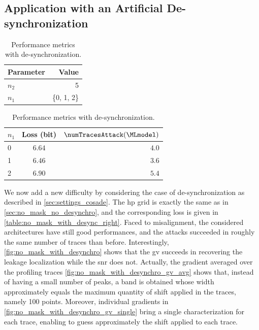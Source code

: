 \subsection{Application with an Artificial De-synchronization}
\label{sec:no_mask_with_desynchro}
\begin{table}
    \centering
    \caption{Settings and results of Exp.~2}
    \label{table:no_mask_with_desync}
    \begin{subtable}{0.49 \textwidth}
        \centering
        \caption{Architecture \glspl{hp}.}
        \begin{tabular}{l r}
            \toprule
            Parameter & Value \\
            \midrule
            \(n_2\) & 5 \\
            \(n_1\) & \{0, 1, 2\} \\
            \bottomrule
        \end{tabular}
        \label{table:no_mask_with_desync_left}
    \end{subtable}
    \begin{subtable}{0.49 \textwidth}
        \centering
        \caption{Performance metrics with de-synchronization.}
        \begin{tabular}{l c r}
            \toprule
            \(n_1\) & Loss (bit) & \(\numTracesAttack(\MLmodel)\) \\
            \midrule
            0 & \(6.64\) & \(4.0\) \\
            1 & \(6.46\) & \(3.6\) \\
            2 & \(6.90\) & \(5.4\) \\
            \bottomrule
        \end{tabular}
        \label{table:no_mask_with_desync_right}
    \end{subtable}
\end{table}

We now add a new difficulty by considering the case of de-synchronization as described in \autoref{sec:settings_cosade}.
The \gls{hp} grid is exactly the same as in \autoref{sec:no_mask_no_desynchro}, and the corresponding loss is given in \autoref{table:no_mask_with_desync_right}. 
Faced to misalignment, the considered architectures have still good performances, and the attacks succeeded in roughly the same number of traces than before. 
Interestingly, \autoref{fig:no_mask_with_desynchro} shows that the \gls{gv} succeeds in recovering the leakage localization while the \gls{snr} does not. 
Actually, the gradient averaged over the profiling traces \autoref{fig:no_mask_with_desynchro_gv_avg} shows that, instead of having a small number of peaks, a band is obtained whose width approximately equals the maximum quantity of shift applied in the traces, namely 100 points. 
Moreover, individual gradients in \autoref{fig:no_mask_with_desynchro_gv_single} bring a single characterization for each trace, enabling to guess approximately the shift applied to each trace.

